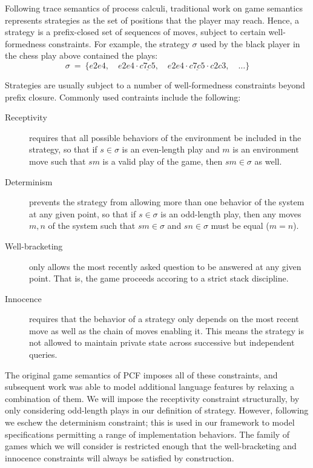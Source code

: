 \documentclass[acmsmall,timestamp,review]{acmart}
\begin{document}
Following trace semantics of process calculi,
traditional work on game semantics
represents strategies as
the set of positions that the player may reach.
Hence,
a strategy is a prefix-closed set of sequences of moves,
subject to certain well-formedness constraints.
For example,
the strategy $\sigma$ used by
the black player in the chess play above
contained the plays:
\[
  \sigma \: = \: \{
    e2e4, \quad
    e2e4 \cdot \underline{c7c5}, \quad
    e2e4 \cdot \underline{c7c5} \cdot c2c3, \quad
    \ldots
  \}
\]

Strategies are usually subject to a number
of well-formedness constraints beyond prefix closure.
Commonly used contraints include the following:
\begin{description}
\item[Receptivity]
  requires that all possible behaviors of the environment
  be included in the strategy,
  so that if $s \in \sigma$ is an even-length play and
  $m$ is an environment move such that $sm$ is a valid play of the game,
  then $sm \in \sigma$ as well.
\item[Determinism]
  prevents the strategy from allowing
  more than one behavior of the system at any given point,
  so that if $s \in \sigma$ is an odd-length play,
  then any moves $m, n$ of the system
  such that $sm \in \sigma$ and $sn \in \sigma$
  must be equal ($m = n$).
\item[Well-bracketing]
  only allows the most recently asked question
  to be answered at any given point.
  That is,
  the game proceeds accoring to a strict stack discipline.
\item[Innocence]
  requires that the behavior of a strategy
  only depends on the most recent move
  as well as the chain of moves enabling it.
  This means the strategy is not allowed to maintain
  private state across
  successive but independent queries.
\end{description}
The original game semantics of PCF \cite{pcfajm,pcfhon}
imposes all of these constraints,
and subsequent work was able to model additional language features
by relaxing a combination of them.
We will impose the receptivity constraint structurally,
by only considering odd-length plays
in our definition of strategy.
However, following \cite{gsnondet} we eschew the determinism constraint;
this is used in our framework
to model specifications permitting
a range of implementation behaviors.
The family of games which we will consider
is restricted enough that
the well-bracketing and innocence constraints
will always be satisfied by construction.
\end{document}
